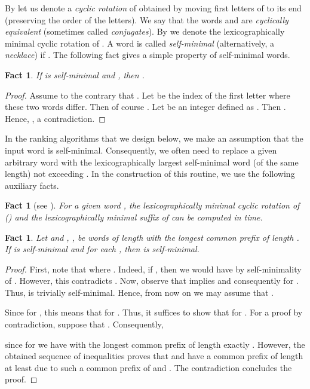 \documentclass{article}
\newcommand{\mayqed}{}
\newtheorem{fact}[theorem]{Fact}
\theoremstyle{definition}
\theoremstyle{remark}
\begin{document}
By  let us denote a \emph{cyclic rotation} of 
obtained by moving  first letters of  to its end (preserving the order of the letters).
We say that the words  and  are \emph{cyclically equivalent}
(sometimes called \emph{conjugates}).
By  we denote the lexicographically minimal cyclic rotation of .
A word  is called \emph{self-minimal} (alternatively, a \emph{necklace}) if .
The following fact gives a simple property of self-minimal words.

\begin{fact}\label{fct:lynd}
  If  is self-minimal and , then
  .
\end{fact}
\begin{proof}
  Assume to the contrary that .
  Let  be the index of the first letter where these two words differ.
  Then of course .
  Let  be an integer defined as .
  Then .
  Hence, , a contradiction.
\mayqed\end{proof}



In the ranking algorithms that we design below, we make an assumption that
the input word is self-minimal.
Consequently, we often need to replace a given arbitrary word  with
the lexicographically largest self-minimal word  (of the same length) not exceeding .
In the construction of this routine, we use the following auxiliary facts.

\begin{fact}[see \cite{DBLP:journals/jal/Duval83}]\label{fct:minrot}
  For a given word , the lexicographically minimal cyclic rotation of  () and the lexicographically minimal suffix of  can be computed in  time.
\end{fact}

  \begin{fact}\label{fct:prvaux}
    Let  and , , be words of length  with the longest common prefix of length .
    If  is self-minimal and  for each , then  is self-minimal.
  \end{fact}
  \begin{proof}
    First, note that  where .
    Indeed, if , then we would have  by self-minimality of .
    However, this contradicts .
    Now, observe that  implies  and consequently  for .
    Thus,  is trivially self-minimal.
    Hence, from now on we may assume that .

    Since  for , this means that  for .
    Thus, it suffices to show that  for .
    For a proof by contradiction, suppose that . Consequently,
    
    since for  we have  with the longest common prefix of length exactly .
    However, the obtained sequence of inequalities proves that  and 
    have a common prefix of length at least  due to such a common prefix of  and .
    The contradiction concludes the proof.
  \mayqed\end{proof}
\end{document}
